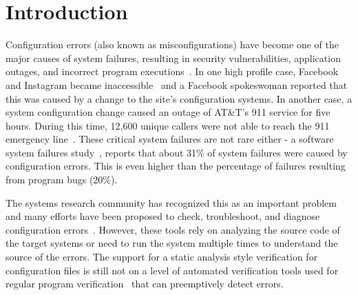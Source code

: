 \section{Introduction}
\label{sec-intro}

Configuration errors (also known as misconfigurations) have become
one of the major causes of system failures, resulting in security vulnerabilities,
application outages, and incorrect program executions~\cite{xu15systems, xu13do, xu15hey}. 
In one high profile case,  
Facebook and Instagram became inaccessible~\cite{mashableNews}
and a Facebook spokeswoman reported that 
this was caused by a change to the site's configuration systems.
In another case, a system configuration change caused an outage of AT\&T's 911 service for five hours.
During this time, 12,600 unique callers were not able to reach the 911 emergency line~\cite{att-outage}.
These critical system failures are not rare either -
a software system failures study~\cite{yin11anempirical},
reports that about 31\% of system failures were caused by 
configuration errors.
This is even higher than the percentage of failures resulting from program bugs (20\%).

The systems research community has recognized this as an important
problem~\cite{xu16early} and many efforts have been proposed to
check, troubleshoot, and diagnose configuration 
errors~\cite{attariyan10automating,
su07autobash, whitaker04configuration,xu2016early}.
However, these tools rely on analyzing the source code of 
the target systems or need to run the system
multiple times to understand the source of the errors.
The support for a static analysis style verification for configuration files
is still not on a level of
automated verification tools used for regular program 
verification~\cite{Leino10Dafny, PiskacWZ14, BobotFMP15} that can
preemptively detect errors. 

